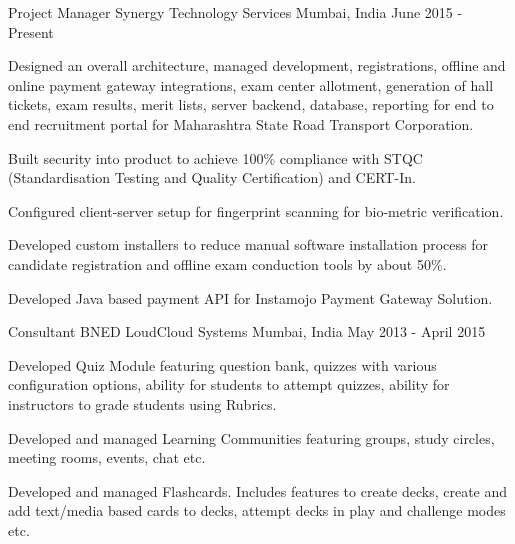 

\begin{cventries}

  \cventry
    {Project Manager} %
    {Synergy Technology Services} %
    {Mumbai, India} %
    {June 2015 - Present} %
    {
      \begin{cvitems} %
        \item {Designed an overall architecture, managed development, registrations, offline and online payment gateway integrations, exam center allotment, generation of hall tickets, exam results, merit lists, server backend, database, reporting for end to end recruitment portal for Maharashtra State Road Transport Corporation.}
        \item {Built security into product to achieve 100\% compliance with STQC (Standardisation Testing and Quality Certification) and CERT-In.}
        \item {Configured client-server setup for fingerprint scanning for bio-metric verification.}
        \item {Developed custom installers to reduce manual software installation process for candidate registration and offline exam conduction tools by about 50\%.}
        \item {Developed Java based payment API for Instamojo Payment Gateway Solution.}
      \end{cvitems}
    }

  \cventry
  {Consultant} %
  {BNED LoudCloud Systems} %
  {Mumbai, India} %
  {May 2013 - April 2015} %
  {
  \begin{cvitems} %
    \item {Developed Quiz Module featuring question bank, quizzes with various configuration options, ability for students to attempt quizzes, ability for instructors to grade students using Rubrics.}
    \item {Developed and managed Learning Communities featuring groups, study circles, meeting rooms, events, chat etc.}
    \item {Developed and managed Flashcards. Includes features to create decks, create and add text/media based cards to decks, attempt decks in play and challenge modes etc.}
  \end{cvitems}
  }


\end{cventries}
